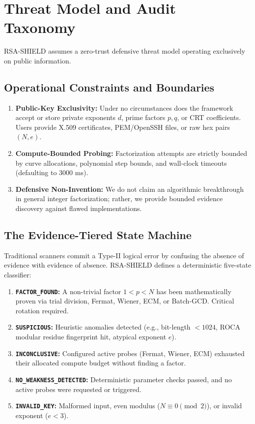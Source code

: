 \documentclass[sigconf,nonacm]{acmart}
\begin{document}
\section{Threat Model and Audit Taxonomy}
RSA-SHIELD assumes a zero-trust defensive threat model operating exclusively on public information.

\subsection{Operational Constraints and Boundaries}
\begin{enumerate}
    \item \textbf{Public-Key Exclusivity:} Under no circumstances does the framework accept or store private exponents $d$, prime factors $p, q$, or CRT coefficients. Users provide X.509 certificates, PEM/OpenSSH files, or raw hex pairs $(N, e)$.
    \item \textbf{Compute-Bounded Probing:} Factorization attempts are strictly bounded by curve allocations, polynomial step bounds, and wall-clock timeouts (defaulting to 3000 ms).
    \item \textbf{Defensive Non-Invention:} We do not claim an algorithmic breakthrough in general integer factorization; rather, we provide bounded evidence discovery against flawed implementations.
\end{enumerate}

\subsection{The Evidence-Tiered State Machine}
Traditional scanners commit a Type-II logical error by confusing the absence of evidence with evidence of absence. RSA-SHIELD defines a deterministic five-state classifier:
\begin{enumerate}
    \item \textbf{\texttt{FACTOR\_FOUND}:} A non-trivial factor $1 < p < N$ has been mathematically proven via trial division, Fermat, Wiener, ECM, or Batch-GCD. Critical rotation required.
    \item \textbf{\texttt{SUSPICIOUS}:} Heuristic anomalies detected (e.g., bit-length $< 1024$, ROCA modular residue fingerprint hit, atypical exponent $e$).
    \item \textbf{\texttt{INCONCLUSIVE}:} Configured active probes (Fermat, Wiener, ECM) exhausted their allocated compute budget without finding a factor.
    \item \textbf{\texttt{NO\_WEAKNESS\_DETECTED}:} Deterministic parameter checks passed, and no active probes were requested or triggered.
    \item \textbf{\texttt{INVALID\_KEY}:} Malformed input, even modulus ($N \equiv 0 \pmod 2$), or invalid exponent ($e < 3$).
\end{enumerate}
\end{document}
